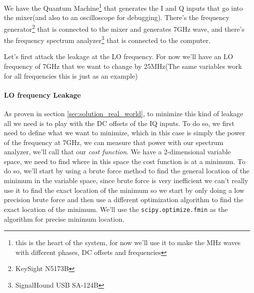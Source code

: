 \documentclass[english, a4paper, 12pt, twoside]{article}
\numberwithin{equation}{section} %
\begin{document}
We have the Quantum Machine\footnote{this is the heart of the system, for now we'll use it to make the MHz waves with different phases, DC offsets and frequencies} that generates the I and Q inputs that go into the mixer(and also to an oscilloscope for debugging). There's the frequency generator\footnote{KeySight N5173B} that is connected to the mixer and generates 7GHz wave, and there's the frequency spectrum analyzer\footnote{SignalHound USB SA-124B} that is connected to the computer.

Let's first attack the leakage at the LO frequency. For now we'll have an LO frequency of 7GHz that we want to change by 25MHz(The same variables work for all frequencies this is just as an example)

\paragraph{LO frequency Leakage}
As proven in section \ref{sec:solution_real_world}, to minimize this kind of leakage all we need is to play with the DC offsets of the IQ inputs. To do so, we first need to define what we want to minimize, which in this case is simply the power of the frequency at 7GHz, we can measure that power with our spectrum analyzer, we'll call that our \textit{cost function}.
We have a 2-dimensional variable space, we need to find where in this space the cost function is at a minimum. To do so, we'll start by using a brute force method to find the general location of the minimum in the variable space, since brute force is very inefficient we can't really use it to find the exact location of the minimum so we start by only doing a low precision brute force and then use a different optimization algorithm to find the exact location of the minimum. We'll use the \texttt{scipy.optimize.fmin} as the algorithm for precise minimum location.%
\end{document}
